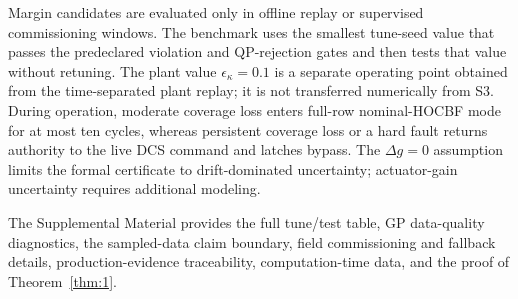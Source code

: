 Margin candidates are evaluated only in offline replay or supervised commissioning windows. The benchmark uses the smallest tune-seed value that passes the predeclared violation and QP-rejection gates and then tests that value without retuning. The plant value $\epsilon_\kappa=0.1$ is a separate operating point obtained from the time-separated plant replay; it is not transferred numerically from S3. During operation, moderate coverage loss enters full-row nominal-HOCBF mode for at most ten cycles, whereas persistent coverage loss or a hard fault returns authority to the live DCS command and latches bypass. The $\Delta g=0$ assumption limits the formal certificate to drift-dominated uncertainty; actuator-gain uncertainty requires additional modeling.

The Supplemental Material provides the full tune/test table, GP data-quality diagnostics, the sampled-data claim boundary, field commissioning and fallback details, production-evidence traceability, computation-time data, and the proof of Theorem~\ref{thm:1}.
